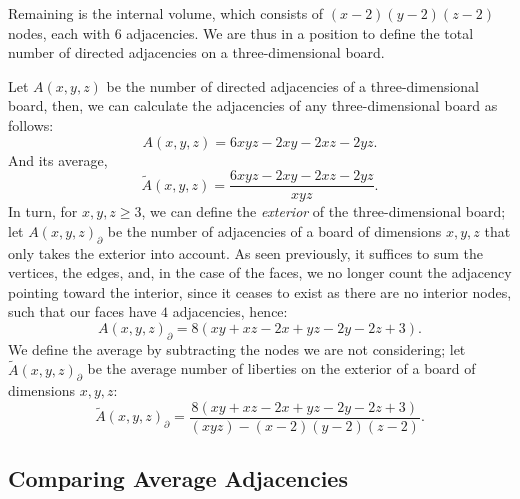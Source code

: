 Remaining is the internal volume, which consists of \((x-2)(y-2)(z-2)\) nodes, each with $6$ adjacencies. We are thus in a position to define the total number of directed adjacencies on a three-dimensional board. 

Let \(A(x,y,z)\) be the number of directed adjacencies of a three-dimensional board, then, we can calculate the adjacencies of any three-dimensional board as follows:
$$
A(x,y,z)=6 x y z - 2 x y - 2 x z - 2 y z.
$$   
And its average,
$$
\tilde{A}(x,y,z)=\frac{6 x y z - 2 x y - 2 x z - 2 y z}{xyz}.
$$
In turn, for $x, y, z \ge 3$, we can define the \textit{exterior} of the three-dimensional board; let \(A(x,y,z)_{\partial}\) be the number of adjacencies of a board of dimensions \(x, y, z\) that only takes the exterior into account. As seen previously, it suffices to sum the vertices, the edges, and, in the case of the faces, we no longer count the adjacency pointing toward the interior, since it ceases to exist as there are no interior nodes, such that our faces have $4$ adjacencies, hence:
$$
A(x,y,z)_{\partial}=8 (x y + x z - 2 x + y z - 2 y - 2 z + 3).
$$
We define the average by subtracting the nodes we are not considering; let \(\tilde{A}(x,y,z)_{\partial}\) be the average number of liberties on the exterior of a board of dimensions \(x, y, z\):
$$
\tilde{A}(x,y,z)_{\partial}=\frac{8 (x y + x z - 2 x + y z - 2 y - 2 z + 3)}{(xyz)-(x-2)(y-2)(z-2)}.
$$
\subsection{Comparing Average Adjacencies}\label{key:libprom}

